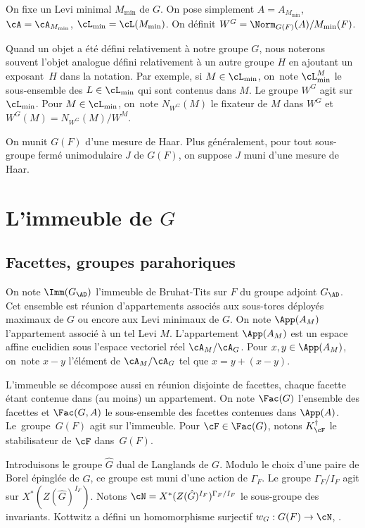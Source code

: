 On fixe un Levi minimal $M_{\min}$ de $G$. On pose simplement $A=A_{M_{\min}}$, $\cA=\cA_{M_{\min}}$, $\cL_{\min}=\cL(M_{\min})$. On définit $W^G=\Norm_{G(F)}(A)/M_{\min}(F)$.

Quand un objet a été défini relativement à notre groupe $G$, nous noterons souvent l'objet analogue défini relativement à un autre groupe $H$ en ajoutant un exposant~$H$ dans la notation. Par exemple, si $M\in \cL_{\min}$, on~note $\cL_{\min}^M$ le sous-ensemble des $L\in \cL_{\min}$ qui sont contenus dans $M$. Le groupe $W^G$ agit sur $\cL_{\min}$.
Pour $M\in \cL_{\min}$, on~note $N_{W^G}(M)$ le fixateur de $M$ dans $W^G$ et $W^G(M)=N_{W^G}(M)/W^M$.

On munit $G(F)$ d'une mesure de Haar. Plus généralement, pour tout sous-groupe fermé unimodulaire $J$ de $G(F)$, on suppose $J$ muni d'une mesure de Haar.

\section{L'immeuble de \texorpdfstring{$G$}{G}}

\subsection{Facettes, groupes parahoriques}\label{facettes}

On note $\Imm(G_{\AD})$ l'immeuble de Bruhat-Tits sur $F$ du groupe adjoint $G_{\AD}$. Cet ensemble est réunion d'appartements associés aux sous-tores déployés maximaux de $G$ ou encore aux Levi minimaux de $G$. On note $\App(A_{M})$ l'appartement associé à un tel Levi $M$. L'appartement $\App(A_{M})$ est un espace affine euclidien sous l'espace vectoriel réel $\cA_{M}/\cA_{G}$. Pour $x,y\in \App(A_{M})$, on~note $x-y$ l'élément de $\cA_{M}/\cA_{G}$ tel que $x=y+(x-y)$.

L'immeuble se décompose aussi en réunion disjointe de facettes, chaque facette étant contenue dans (au moins) un appartement. On note $\Fac(G)$ l'ensemble des facettes et $\Fac(G,A)$ le sous-ensemble des facettes contenues dans $\App(A)$. Le~grou\-pe~$G(F)$ agit sur l'immeuble. Pour $\cF\in \Fac(G)$, notons $K_{\cF}^{\dag}$ le stabilisateur de $\cF$ dans~$G(F)$.

Introduisons le groupe $\hat{G}$ dual de Langlands de $G$. Modulo le choix d'une paire de Borel épinglée de $\hat{G}$, ce groupe est muni d'une action de $\Gamma_{F}$. Le groupe $\Gamma_{F}/I_{F}$ agit sur $X^*(Z(\hat{G})^{I_{F}})$. Notons $\cN=X^{*}(Z(\hat{G})^{I_{F}})^{\Gamma_{F}/I_{F}}$ le sous-groupe des invariants. Kottwitz a défini un homomorphisme surjectif $w_{G}:G(F)\to \cN$, \cf \cite[\S7]{K}.

